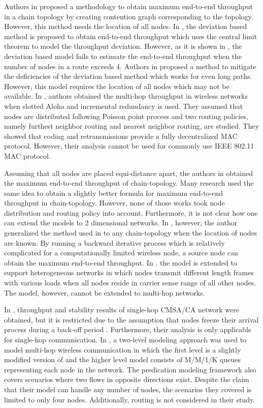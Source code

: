 \documentclass[12pt, draftclsnofoot, onecolumn]{IEEEtran}
\begin{document}
Authors in \cite{ref2} proposed a methodology to obtain maximum end-to-end 
throughput in a chain topology by creating contention graph corresponding to 
the topology. However, this method needs the location of all nodes. In \cite{ref11}, 
the deviation based method is proposed to obtain end-to-end throughput 
which uses the central limit theorem to model the throughput deviation. 
However, as it is shown in \cite{ref3}, the deviation based 
model fails to estimate the end-to-end throughput when the number of 
nodes in a route exceeds 4. Authors in \cite{ref3} proposed a method to 
mitigate the deficiencies of the deviation based method which works for 
even long paths. However, this model requires the location of all nodes which 
may not be available. In \cite{tabet2004spatial}, authors obtained the multi-hop throughput in wireless networks when slotted Aloha and incremental redundancy is used. They assumed that nodes are distributed following Poisson point process and two routing policies, namely furthest neighbor routing and nearest neighbor routing, are studied. They showed that coding and retransmissions provide a fully decentralized MAC protocol. However, their analysis cannot be used for commonly use IEEE 802.11 MAC protocol. 

Assuming that all nodes are placed equi-distance apart, the 
authors in \cite{ref1} obtained the maximum end-to-end throughput of chain-topology. Many 
research \cite{ref4,ref5,ref6,ref8,ref9,ref10,ref14,ref17,yin2016throughput} used the same idea 
to obtain a slightly better formula for maximum end-to-end throughput in 
chain-topology. However, none of those works took node distribution and 
routing policy into account. Furthermore, it is not clear how one can extend the models to 2 dimensional networks. In \cite{ref13}, however, the author generalized 
the method used in \cite{ref1} to any chain-topology when the location of 
nodes are known. By running a backward iterative process which is relatively 
complicated for a computationally limited wireless node, a source node can 
obtain the maximum end-to-end throughput. In \cite{yin2016throughput}, the model is extended to support heterogeneous networks
in which nodes transmit different length frames with various loads when all nodes reside in carrier sense range of all other nodes. The model, however, cannot be extended to multi-hop networks.

In \cite{7121036}, throughput and stability results of single-hop CMSA/CA network were obtained, but
it is restricted due to the assumption that nodes freeze their arrival process during a back-off period \cite{shneer2015stability}. Furthermore,
their analysis is only applicable for single-hop communication. In \cite{begin2016performance}, a two-level modeling approach was
used to model multi-hop wireless communication in which the first level is a slightly modified version of \cite{Bianchi} and the higher level model consists of
M/M/1/K queues representing each node in the network. The predication modeling framework also covers scenarios where two flows in opposite directions exist. 
Despite the claim that their model can handle any number of nodes, the scenarios they covered is limited to only four nodes. Additionally, routing is not considered in their study.
\end{document}
